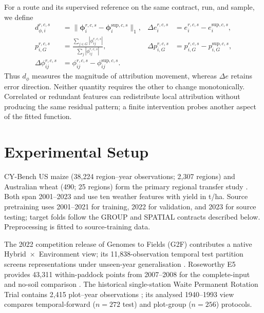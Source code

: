 \documentclass[runningheads]{venue/lncs/llncs}
\begin{document}
For a route and its supervised reference on the same contract, run, and sample, we define
\begin{subequations}
\label{eq:matched-diagnostics}
\begin{align}
d_{\phi,i}^{r,c,s}&=\|\boldsymbol{\phi}_i^{r,c,s}-\boldsymbol{\phi}_i^{\mathrm{sup},c,s}\|_1, &
\Delta e_i^{r,c,s}&=e_i^{r,c,s}-e_i^{\mathrm{sup},c,s},\nonumber\\
p_{i,G}^{r,c,s}&=\frac{\sum_{j\in G}|\phi_{ij}^{r,c,s}|}{\sum_j|\phi_{ij}^{r,c,s}|}, &
\Delta p_{i,G}^{r,c,s}&=p_{i,G}^{r,c,s}-p_{i,G}^{\mathrm{sup},c,s},\\
\Delta\phi_{ij}^{r,c,s}&=\phi_{ij}^{r,c,s}-\phi_{ij}^{\mathrm{sup},c,s}.
\end{align}
\end{subequations}
Thus $d_\phi$ measures the magnitude of attribution movement, whereas $\Delta e$ retains error direction. Neither quantity requires the other to change monotonically. Correlated or redundant features can redistribute local attribution without producing the same residual pattern; a finite intervention probes another aspect of the fitted function.

\section{Experimental Setup}

CY-Bench US maize (38,224 region--year observations; 2,307 regions) and Australian wheat (490; 25 regions) form the primary regional transfer study \cite{Kallenberg2026CYBench}. Both span 2001--2023 and use ten weather features with yield in t/ha. Source pretraining uses 2001--2021 for training, 2022 for validation, and 2023 for source testing; target folds follow the GROUP and SPATIAL contracts described below. Preprocessing is fitted to source-training data.

The 2022 competition release of Genomes to Fields (G2F) contributes a native Hybrid~$\times$~Environment view; its 11,838-observation temporal test partition screens representations under unseen-year generalisation \cite{McFarland2020G2F}. Roseworthy E5 provides 43,311 within-paddock points from 2007--2008 for the complete-input and no-soil comparison \cite{David2022RoseworthyDataset}. The historical single-station Waite Permanent Rotation Trial contains 2,415 plot--year observations \cite{Sanderman2015WaiteDataset}; its analysed 1940--1993 view compares temporal-forward ($n=272$ test) and plot-group ($n=256$) protocols.
\end{document}
